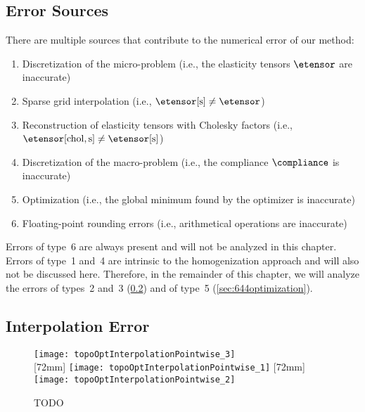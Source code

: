 \subsection{Error Sources}
\label{sec:642errorSources}

There are multiple sources that contribute to the numerical error
of our method:

\begin{enumerate}
  \item
  Discretization of the micro-problem
  (i.e., the elasticity tensors $\etensor$ are inaccurate)
  
  \item
  Sparse grid interpolation
  (i.e., $\etensor[\sparse] \not= \etensor$)
  
  \item
  Reconstruction of elasticity tensors with Cholesky factors
  (i.e., $\etensor[\chol,\sparse] \not= \etensor[\sparse]$)
  
  \item
  Discretization of the macro-problem
  (i.e., the compliance $\compliance$ is inaccurate)
  
  \item
  Optimization
  (i.e., the global minimum found by the optimizer is inaccurate)
  
  \item
  Floating-point rounding errors
  (i.e., arithmetical operations are inaccurate)
\end{enumerate}

\noindent
Errors of type~6 are always present and will not be analyzed in this chapter.
Errors of type~1 and~4 are intrinsic to the homogenization approach
and will also not be discussed here.
Therefore, in the remainder of this chapter,
we will analyze the errors of types~2 and~3 (\cref{sec:643interpolation})
and of type~5 (\cref{sec:644optimization}).



\subsection{Interpolation Error}
\label{sec:643interpolation}

\begin{figure}
  \texttt{[image: topoOptInterpolationPointwise\_3]}\\[2mm]%
  [72mm]{%
    \texttt{[image: topoOptInterpolationPointwise\_1]}%
  }%
  \hfill%
  [72mm]{%
    \texttt{[image: topoOptInterpolationPointwise\_2]}%
  }%
  \caption[TODO]{%
    TODO%
  }%
  \label{fig:topoOptInterpolationErrorPointwise}%
\end{figure}

